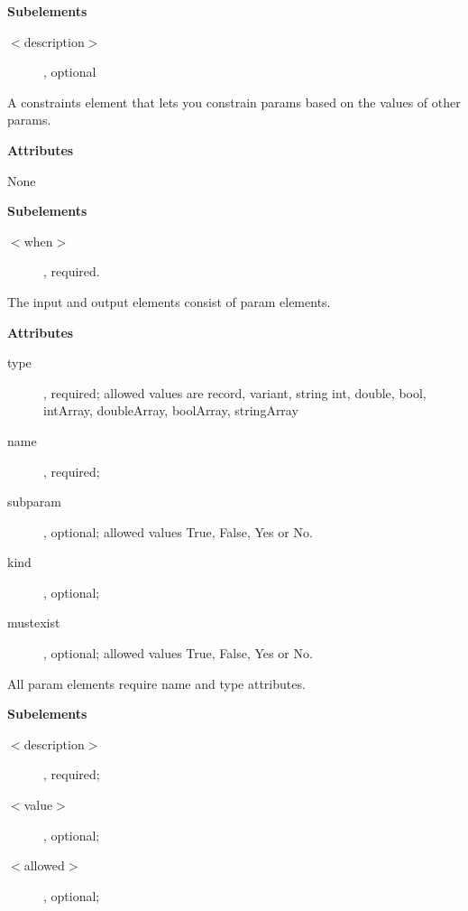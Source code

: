 \begin{description}
\begin{description}
\begin{description}
\end{description}
\item \textbf{Subelements}
\begin{description}
\item [$<$description$>$], optional
\end{description}
\end{description}
\item[$<$constraints$>$ - optional]
A constraints element that lets you constrain params based on the values of other params.
\begin{description}
\item \textbf{Attributes}
\begin{description}
\item None
\end{description}
\item \textbf{Subelements}
\begin{description}
\item [$<$when$>$], required.
\end{description}
\end{description}
\item [$<$param$>$ - optional]
The input and output elements consist of param elements.
\begin{description}
\item \textbf{Attributes}
\begin{description}
\item [type], required; allowed values are record, variant, string int,
double, bool, intArray, doubleArray, boolArray, stringArray
\item [name], required;
\item [subparam], optional; allowed values True, False, Yes or No.
\item [kind], optional;
\item [mustexist], optional; allowed values True, False, Yes or No.
\end{description}
All param elements require name and type attributes.
\item \textbf{Subelements}
\begin{description}
\item [$<$description$>$], required;
\item [$<$value$>$], optional;
\item [$<$allowed$>$], optional;
\end{description}
\end{description}
\item [$<$value$>$ - optional]

\end{description}
